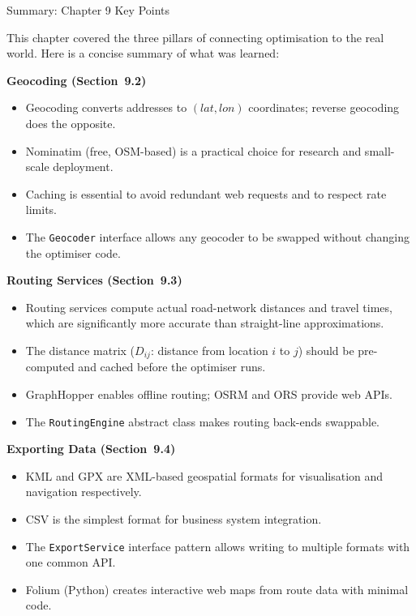 \documentclass[aspectratio=169,10pt]{beamer}
\begin{document}
\begin{frame}[allowframebreaks]{Summary: Chapter 9 Key Points}

  This chapter covered the three pillars of connecting optimisation to the
  real world.  Here is a concise summary of what was learned:

  \textbf{Geocoding (Section~9.2)}
  \begin{itemize}
    \item Geocoding converts addresses to $(lat, lon)$ coordinates; reverse
          geocoding does the opposite.
    \item Nominatim (free, OSM-based) is a practical choice for research and
          small-scale deployment.
    \item Caching is essential to avoid redundant web requests and to respect
          rate limits.
    \item The \texttt{Geocoder} interface allows any geocoder to be swapped
          without changing the optimiser code.
  \end{itemize}

  \textbf{Routing Services (Section~9.3)}
  \begin{itemize}
    \item Routing services compute actual road-network distances and travel
          times, which are significantly more accurate than straight-line
          approximations.
    \item The distance matrix ($D_{ij}$: distance from location $i$ to $j$)
          should be pre-computed and cached before the optimiser runs.
    \item GraphHopper enables offline routing; OSRM and ORS provide web APIs.
    \item The \texttt{RoutingEngine} abstract class makes routing back-ends
          swappable.
  \end{itemize}

  \textbf{Exporting Data (Section~9.4)}
  \begin{itemize}
    \item KML and GPX are XML-based geospatial formats for visualisation
          and navigation respectively.
    \item CSV is the simplest format for business system integration.
    \item The \texttt{ExportService} interface pattern allows writing to
          multiple formats with one common API.
    \item Folium (Python) creates interactive web maps from route data with
          minimal code.
  \end{itemize}


\end{frame}
\end{document}
